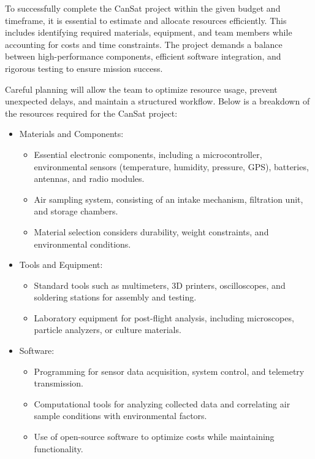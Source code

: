 To successfully complete the CanSat project within the given budget and timeframe, it is essential to estimate and allocate resources efficiently. This includes identifying required materials, equipment, and team members while accounting for costs and time constraints. The project demands a balance between high-performance components, efficient software integration, and rigorous testing to ensure mission success.

Careful planning will allow the team to optimize resource usage, prevent unexpected delays, and maintain a structured workflow. Below is a breakdown of the resources required for the CanSat project:

\begin{itemize}[leftmargin=1cm, itemindent=0.25cm, noitemsep, topsep=0pt, label=$\bullet$]

\item Materials and Components:
\begin{itemize}[label=, noitemsep, topsep=1pt]
\item Essential electronic components, including a microcontroller, environmental sensors (temperature, humidity, pressure, GPS), batteries, antennas, and radio modules.
\item Air sampling system, consisting of an intake mechanism, filtration unit, and storage chambers.
\item Material selection considers durability, weight constraints, and environmental conditions.
\end{itemize}

\item Tools and Equipment:
\begin{itemize}[label=, noitemsep, topsep=1pt]
\item Standard tools such as multimeters, 3D printers, oscilloscopes, and soldering stations for assembly and testing.
\item Laboratory equipment for post-flight analysis, including microscopes, particle analyzers, or culture materials.
\end{itemize}

\item Software:
\begin{itemize}[label=, noitemsep, topsep=1pt]
\item Programming for sensor data acquisition, system control, and telemetry transmission.
\item Computational tools for analyzing collected data and correlating air sample conditions with environmental factors.
\item Use of open-source software to optimize costs while maintaining functionality.
\end{itemize}


\end{itemize}
